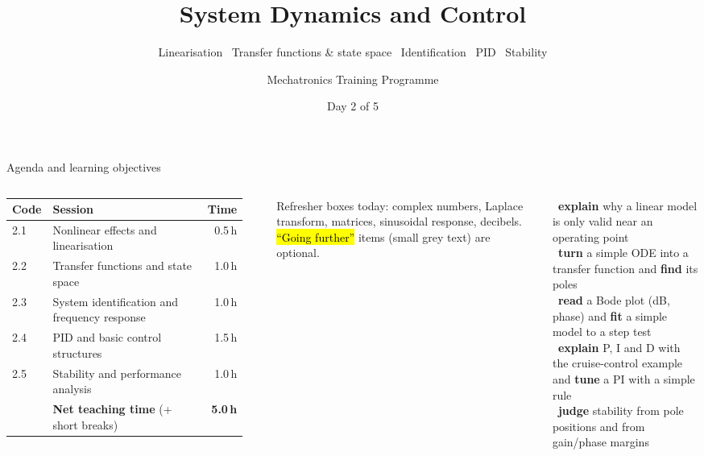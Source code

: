 \documentclass[aspectratio=169,10pt]{beamer}
\title[System Dynamics and Control]{System Dynamics and Control}
\subtitle{Linearisation \textbullet\ Transfer functions \& state space \textbullet\ Identification \textbullet\ PID \textbullet\ Stability}
\author{Mechatronics Training Programme}
\institute{Theoretical Course Series}
\date{Day 2 of 5}
\begin{document}
\begin{frame}[plain]\titlepage\end{frame}

\begin{frame}{Agenda and learning objectives}
\begin{columns}[T]
\footnotesize
\begin{tabular}{@{}lp{4.2cm}r@{}}
\toprule
\textbf{Code} & \textbf{Session} & \textbf{Time}\\
\midrule
2.1 & Nonlinear effects and linearisation & 0.5\,h\\
2.2 & Transfer functions and state space & 1.0\,h\\
2.3 & System identification and frequency response & 1.0\,h\\
2.4 & PID and basic control structures & 1.5\,h\\
2.5 & Stability and performance analysis & 1.0\,h\\
\midrule
 & \textbf{Net teaching time} (+ short breaks) & \textbf{5.0\,h}\\
\bottomrule
\end{tabular}\\[2mm]
\begin{notebox}
Refresher boxes today: complex numbers, Laplace transform, matrices, sinusoidal response, decibels.
\hl{``Going further''} items (small grey text) are optional.
\end{notebox}
\begin{defbox}
\footnotesize
\checkitem\ \textbf{explain} why a linear model is only valid near an operating point\\[2pt]
\checkitem\ \textbf{turn} a simple ODE into a transfer function and \textbf{find} its poles\\[2pt]
\checkitem\ \textbf{read} a Bode plot (dB, phase) and \textbf{fit} a simple model to a step test\\[2pt]
\checkitem\ \textbf{explain} P, I and D with the cruise-control example and \textbf{tune} a PI with a simple rule\\[2pt]
\checkitem\ \textbf{judge} stability from pole positions and from gain/phase margins
\end{defbox}
\end{columns}
\end{frame}

\end{document}
